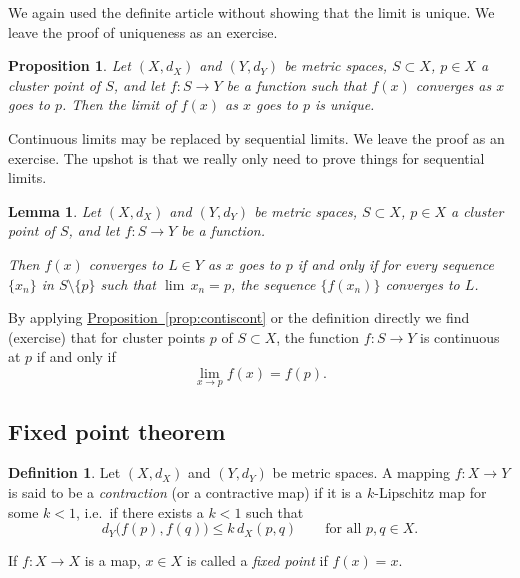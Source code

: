 \documentclass[12pt,openany]{book}
\newcommand{\myindex}[1]{#1\index{#1}}
\theoremstyle{plain}
\newtheorem{lemma}[thm]{Lemma}
\newtheorem{prop}[thm]{Proposition}
\theoremstyle{remark}
\theoremstyle{definition}
\newtheorem{defn}[thm]{Definition}
\theoremstyle{exercise}
\theoremstyle{example}
\newcommand{\propref}[1]{\hyperref[#1]{Proposition~\ref*{#1}}}
\begin{document}
We again used the definite article without showing that the
limit is unique.  We leave the proof of uniqueness as an exercise.

\begin{prop} \label{prop:mslimitisunique}
Let $(X,d_X)$ and $(Y,d_Y)$ be metric spaces, $S \subset X$, $p \in X$
a cluster point of $S$, and let $f \colon S \to Y$ be a function
such that $f(x)$ converges as $x$ goes to $p$.  Then
the limit of $f(x)$ as $x$ goes to $p$ is unique.
\end{prop}

Continuous limits may be
replaced by sequential limits.  We leave the proof as an
exercise.  The upshot is that we really only need to prove things for
sequential limits.

\begin{lemma}\label{ms:seqflimit:lemma}
Let $(X,d_X)$ and $(Y,d_Y)$ be metric spaces, $S \subset X$, $p \in X$
a cluster point of $S$, and let $f \colon S \to Y$ be a function.

Then
$f(x)$ converges to $L \in Y$ as $x$ goes to $p$ if and only if for every sequence $\{ x_n \}$
in $S \setminus \{p\}$
such that $\lim\, x_n = p$,
the sequence $\{ f(x_n) \}$ converges to $L$.
\end{lemma}

By applying \propref{prop:contiscont} or the definition directly we find
(exercise) that for cluster points $p$ of $S
\subset X$, the function
$f \colon S \to Y$ is continuous at $p$ if and only if
\begin{equation*}
\lim_{x \to p} f(x) = f(p) .
\end{equation*}

\subsection{Fixed point theorem}

\begin{defn}
Let $(X,d_X)$ and $(Y,d_Y)$ be metric spaces.
A mapping
$f \colon X \to Y$ is said to be a \emph{\myindex{contraction}}
(or a contractive map) if it is
a $k$-Lipschitz map for some $k < 1$, i.e.\ if there exists a $k < 1$ such that
\begin{equation*}
d_Y\bigl(f(p),f(q)\bigr) \leq k\, d_X(p,q)
\qquad \text{for all } p,q \in X.
\end{equation*}

\medskip

If $f \colon X \to X$ is a map, $x \in X$ is called a
\emph{\myindex{fixed point}}
if $f(x)=x$.
\end{defn}
\end{document}
